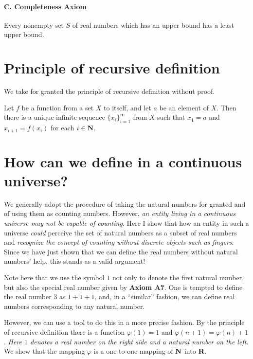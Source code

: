 \documentclass{article}
\begin{document}
\paragraph{C. Completeness Axiom}
Every nonempty set $S$ of real numbers
which has an upper bound has a least upper bound.


\section{Principle of recursive definition}

We take for granted the principle of recursive definition
without proof.

\begin{principle}
Let $f$ be a function from a set $X$ to itself,
and let $a$ be an element of $X$.
Then there is a unique infinite sequence $\{x_i\}_{i=1}^\infty$ from $X$
such that $x_1 = a$ and $x_{i+1} = f(x_i)$ for each $i\in {\mbox{\bf N}}$.
\end{principle}


\section{How can we define in a continuous universe?}

We generally adopt the procedure of taking the natural numbers
for granted and of using them as counting numbers.
However, \emph{an entity living in a continuous universe
may not be capable of counting}.
Here I show that how an entity in such a universe
\emph{could} perceive the set of natural numbers
as a subset of real numbers
and \emph{recognize the concept of counting without discrete objects such as fingers}.
Since we have just shown that we can define the real numbers without natural numbers' help,
this stands as a valid argument!


Note here that we use the symbol $1$ not only to denote the first natural number,
but also the special real number given by {\bf Axiom A7}.
One is tempted to define the real number $3$ as $1 + 1 + 1$,
and, in a ``similar'' fashion,
we can define real numbers corresponding to any natural number.

However, we can use a tool to do this in a more precise fashion.
By the principle of recursive definition
there is a function $\varphi(1) = 1$
and $\varphi(n+1) = \varphi(n) + 1$.
\emph{Here $1$ denotes a real number on the right side and a natural number on the left.}
We show that the mapping $\varphi$ is a one-to-one mapping of ${\mbox{\bf N}}$ into ${\mbox{\bf R}}$.
\end{document}
